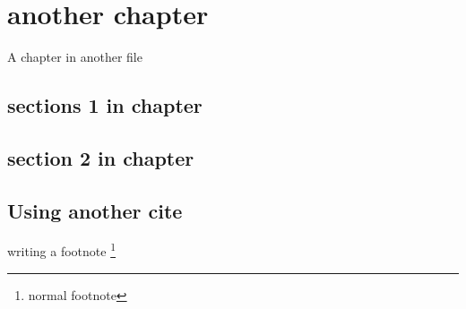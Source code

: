 \chapter{another chapter}
A chapter in another file
\section{sections 1 in chapter}
\section{section 2 in chapter}
\section{Using another cite \cite{lesk:1977}}

writing a footnote \footnote{normal footnote} \footnotemark